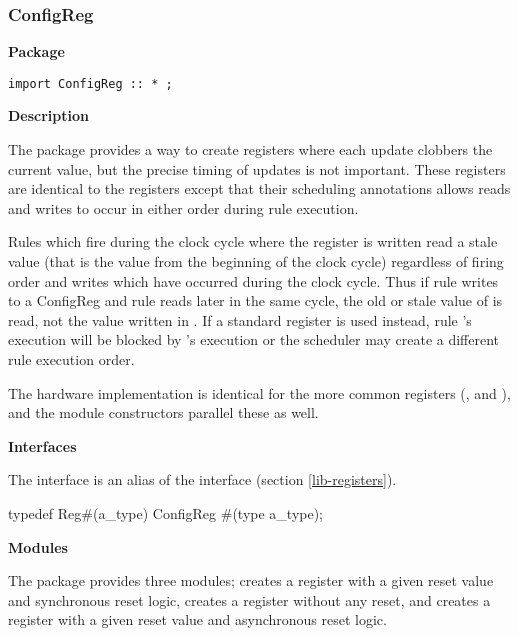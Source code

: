 \subsubsection{ConfigReg}
\label{ref-configreg}

{\bf Package}

\begin{verbatim}
import ConfigReg :: * ;
\end{verbatim}



{\bf Description}


The  package provides a way to create registers where
each  update clobbers the current value, but the precise timing of
updates  is not important.  These registers are identical to the
 registers except that their scheduling annotations allows
reads and writes to occur in either order during rule execution.  

Rules which fire during the clock cycle where the register is written
read a stale value (that is the value from the beginning of the clock
cycle) regardless of firing order and writes which have occurred
during the clock cycle.  Thus
if rule  writes to a ConfigReg  and rule  reads
 later in the same cycle, the old or stale value of  is
read, not the value written in .  If a standard register is
used instead, rule 's execution will be blocked by 's
execution or the scheduler may create a different rule execution order.

The hardware implementation is identical for the more common
registers (,  and ), and the module constructors
parallel these as well.

{\bf Interfaces}

 The  interface is an alias of the  interface
(section \ref{lib-registers}).
\begin{libverbatim}
typedef Reg#(a_type) ConfigReg #(type a_type);
\end{libverbatim}


{\bf Modules}

The  package provides three modules; 
creates a register with a given reset value and synchronous reset
logic,  creates a register without any reset, and
 creates a register with a given reset value and
asynchronous reset logic.

